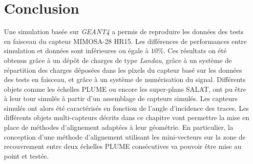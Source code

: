 %   
% 
%   
% 

 \section{Conclusion}

   Une simulation bas\'ee sur \textit{GEANT4} a permis de reproduire les donn\'ees des tests en faisceau du capteur MIMOSA-28 HR15. Les diff\'erences de performances entre simulation et donn\'ees sont inf\'erieures ou \'egale \`a $10 \%$. Ces r\'esultats on \'et\'e obtenus gr\^ace \`a un d\'epôt de charges de type \textit{Landau}, gr\^ace \`a un syst\`eme de r\'epartition des charges d\'epos\'ees dans les pixels du capteur bas\'e sur les donn\'ees des tests en faisceau, et gr\^ace \`a un syst\`eme de num\'erisation du signal. Diff\'erents objets comme les échelles PLUME ou encore les super-plans SALAT, ont pu \^etre \`a leur tour simul\'es \`a partir d'un assemblage de capteurs simul\'es. Les capteurs simul\'es ont alors \'et\'e caract\'eris\'es en fonction de l'angle d'incidence des traces. Les diff\'erents objets multi-capteurs d\'ecrits dans ce chapitre vont permettre la mise en place de m\'ethodes d'alignement adapt\'ees \`a leur g\'eom\'etrie. En particulier, la conception d'une m\'ethode d'alignement utilisant les mini-vecteurs sur la zone de recouvrement entre deux \'echelles PLUME cons\'ecutives va pouvoir \^etre mise au point et test\'ee.  


